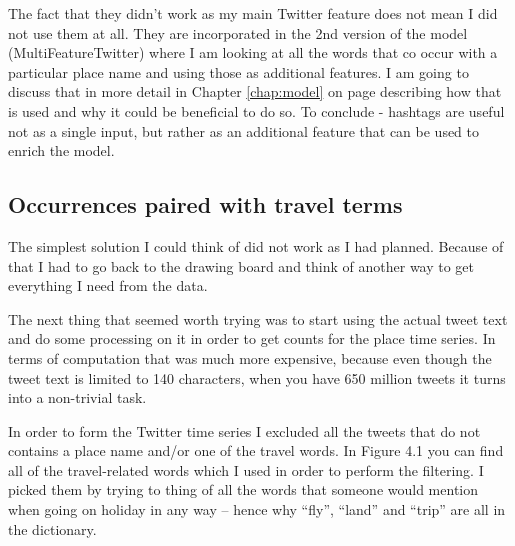 \documentclass[minf,twoside,singlespacing,parskip,frontabs,notimes,11pt]{infthesis}
\begin{document}
The fact that they didn't work as my main Twitter feature does not mean I did not use them at all. They are incorporated in the 2nd version of the model (MultiFeatureTwitter) where I am looking at all the words that co occur with a particular place name and using those as additional features. I am going to discuss that in more detail in Chapter \ref{chap:model} on page \pageref{chap:model} describing how that is used and why it could be beneficial to do so. To conclude - hashtags are useful not as a single input, but rather as an additional feature that can be used to enrich the model.



\subsection{Occurrences paired with travel terms} 
\label{sec:tweettext}

The simplest solution I could think of did not work as I had planned. Because of that I had to go back to the drawing board and think of another way to get everything I need from the data. 


The next thing that seemed worth trying was to start using the actual tweet text and do some processing on it in order to get counts for the place time series. In terms of computation that was much more expensive, because even though the tweet text is limited to 140 characters, when you have 650 million tweets it turns into a non-trivial task. 

In order to form the Twitter time series I excluded all the tweets that do not contains a place name and/or one of the travel words. In Figure 4.1 you can find all of the travel-related words which I used in order to perform the filtering. I picked them by trying to thing of all the words that someone would mention when going on holiday in any way -- hence why ``fly'', ``land'' and ``trip'' are all in the dictionary. 
\end{document}
